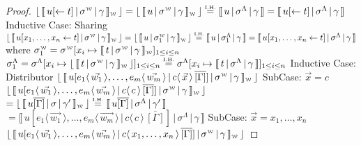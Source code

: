 \documentclass[a4paper,UKenglish,cleveref, autoref]{lipics-v2019}
\newcommand{\share}[3]{#1 [#2 \leftarrow #3]}
\newcommand{\dist}[5]{#1 [ #2 \, \vert \, \fakedist{#4}{#5} \, #3 ]}
\newcommand{\fakedist}[2]{#1 \langle \, #2 \, \rangle}
\newcommand{\weaksymbol}{\mbox{\tiny $\mathcal{W}$}}
\newcommand{\readbackwmap}[3]{\llbracket \, #1 \, \vert \, #2 \, \vert \, #3  \, \rrbracket }
\newcommand{\readweakwmap}[3]{\llbracket \, #1 \, \vert \, #2 \, \vert \, #3  \, \rrbracket_{\weaksymbol} }
\newcommand{\readbackweak}[1]{\lfloor \, #1 \, \rfloor}
\newcommand{\IH}{\stackrel{\hbox{\tiny I.H.}}{\hbox{=}}}
\begin{document}
\begin{proof}
$\readbackweak{\readweakwmap{\share{u}{}{t}}{\sigma^{\weaksymbol}}{\gamma}} = \readbackweak{\readweakwmap{u}{\sigma^{\weaksymbol}}{\gamma}} \IH \readbackwmap{u}{\sigma^{\Lambda}}{\gamma} = \readbackwmap{\share{u}{}{t}}{\sigma^{\Lambda}}{\gamma}$
\newline
\newline
Inductive Case: Sharing
\newline
$\readbackweak{\readweakwmap{\share{u}{x_{1}, \dots, x_{n}}{t}}{\sigma^{\weaksymbol}}{\gamma}} = \readbackweak{\readweakwmap{u}{\sigma_{1}^{\weaksymbol}}{\gamma}} \IH \readbackwmap{u}{\sigma_{1}^{\Lambda}}{\gamma}= \readbackwmap{\share{u}{x_{1}, \dots, x_{n}}{t}}{\sigma^{\Lambda}}{\gamma}$
\newline
where 
\newline
$\sigma_{1}^{\weaksymbol} = \sigma^{\weaksymbol} [x_{i} \mapsto \readweakwmap{t}{\sigma^{\weaksymbol}}{\gamma}]_{1 \leq i \leq n}$
\newline
$\sigma_{1}^{\Lambda} = \sigma^{\Lambda} [x_{i} \mapsto \readbackweak{\readweakwmap{t}{\sigma^{\weaksymbol}}{\gamma}}]_{1 \leq i \leq n} \IH  \sigma^{\Lambda} [x_{i} \mapsto \readbackwmap{t}{\sigma^{\Lambda}}{\gamma} ]_{1 \leq i \leq n} $
\newline
\newline
Inductive Case: Distributor
\newline
$\readbackweak{\readweakwmap{\dist{u}{\fakedist{e_{1}}{\vec{w_{1}}}, \dots, \fakedist{e_{m}}{\vec{w_{m}}}}{\overline{[\Gamma]}}{c}{\vec{x}}}{\sigma^{\weaksymbol}}{\gamma}}$
\newline
\newline
\indent SubCase: $\vec{x} = c$
\newline
$\readbackweak{\readweakwmap{\dist{u}{\fakedist{e_{1}}{\vec{w_{1}}}, \dots, \fakedist{e_{m}}{\vec{w_{m}}}}{\overline{[\Gamma]}}{c}{c}}{\sigma^{\weaksymbol}}{\gamma}}$
\newline
$= \readbackweak{\readweakwmap{u \overline{[\Gamma]}}{\sigma}{\gamma'}} \IH \readbackwmap{u \overline{[\Gamma]}}{\sigma^{\Lambda}}{\gamma'}$
\newline
$= \readbackwmap{\dist{u}{\fakedist{e_{1}}{\vec{w_{1}}}, \dots, \fakedist{e_{m}}{\vec{w_{m}}}}{\overline{[\Gamma]}}{c}{c}}{\sigma^{\Lambda}}{\gamma}$
\newline
\newline
\indent SubCase: $\vec{x} = x_{1}, \dots, x_{n}$
\newline
$\readbackweak{\readweakwmap{\dist{u}{\fakedist{e_{1}}{\vec{w_{1}}}, \dots, \fakedist{e_{m}}{\vec{w_{m}}}}{\overline{[\Gamma]}}{c}{x_{1}, \dots, x_{n}}}{\sigma^{\weaksymbol}}{\gamma}}$

\end{proof}
\end{document}
